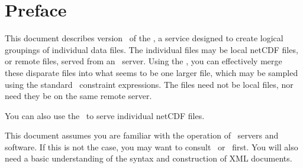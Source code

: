 %
%

\T\chapter*{Preface}
\T{}

This document describes version \aggversion\ of the \AggServer, a
service designed to create logical groupings of individual data
files.  The individual files may be local netCDF files, or remote
files, served from an \opendap\ server.  Using the \aggser, you can
effectively merge these disparate files into what seems to be one
larger file, which may be sampled using the standard \opendap\
constraint expressions.  The files need not be local files, nor need
they be on the same remote server.

You can also use the \aggser\ to serve individual netCDF files.

This document assumes you are familiar with the operation of \opendap\
servers and software.  If this is not the case, you may want to
consult \DODSuser\ or \DODSquick\ first.  You will also need a basic
understanding of the syntax and construction of XML documents.

\W{}







